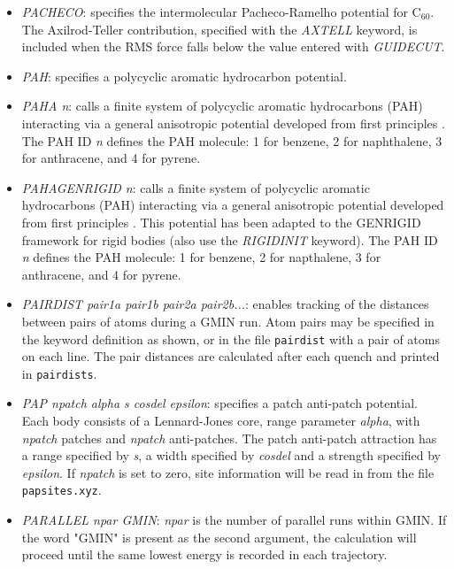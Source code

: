 \documentclass[12pt,a4paper,dvips]{article}
\begin{document}
\begin{itemize}
\item {\it PACHECO\/}: specifies the intermolecular Pacheco-Ramelho potential for C$_{60}$.
The Axilrod-Teller contribution, specified with the {\it AXTELL\/} keyword, is included
when the RMS force falls below the value entered with {\it GUIDECUT\/}.

\item{\it PAH}: specifies a polycyclic aromatic hydrocarbon potential.

\item {\it PAHA n\/}: calls a finite system of polycyclic aromatic hydrocarbons (PAH) interacting 
via a general anisotropic potential developed from first principles \cite{TottonMK10}. The PAH ID  
{\it n} defines the PAH molecule: 1 for benzene, 2 for naphthalene, 3 for anthracene, and 4 for
pyrene.

\item{\it PAHAGENRIGID n\/}: calls a finite system of polycyclic aromatic hydrocarbons (PAH) interacting
via a general anisotropic potential developed from first principles \cite{TottonMK10}. This potential has
been adapted to the GENRIGID framework for rigid bodies (also use the {\it RIGIDINIT\/} keyword). The PAH ID
{\it n} defines the PAH molecule: 1 for benzene, 2 for napthalene, 3 for anthracene, and 4 for pyrene. 

\item{\it PAIRDIST pair1a pair1b pair2a pair2b...}: enables tracking of the distances between pairs of atoms during a GMIN run. Atom pairs may
be specified in the keyword definition as shown, or in the file {\tt pairdist} with a pair of atoms on each line. The pair distances are
calculated after each quench and printed in {\tt pairdists}.

\item {\it PAP npatch alpha s cosdel epsilon\/}: specifies a patch anti-patch potential. Each body consists of a Lennard-Jones core, range parameter {\it alpha\/}, with {\it npatch\/} patches and {\it npatch\/} anti-patches. The patch anti-patch attraction has a range specified by {\it s\/}, a width specified by {\it cosdel\/} and a strength specified by {\it epsilon\/}. If {\it npatch\/} is set to zero, site information will be read in from the file {\tt papsites.xyz\/}.

\item {\it PARALLEL npar GMIN\/}: {\it npar\/} is the number of parallel runs within GMIN.
If the word "GMIN" is present as the second argument, the calculation will proceed until the
same lowest energy is recorded in each trajectory.


\end{itemize}
\end{document}
